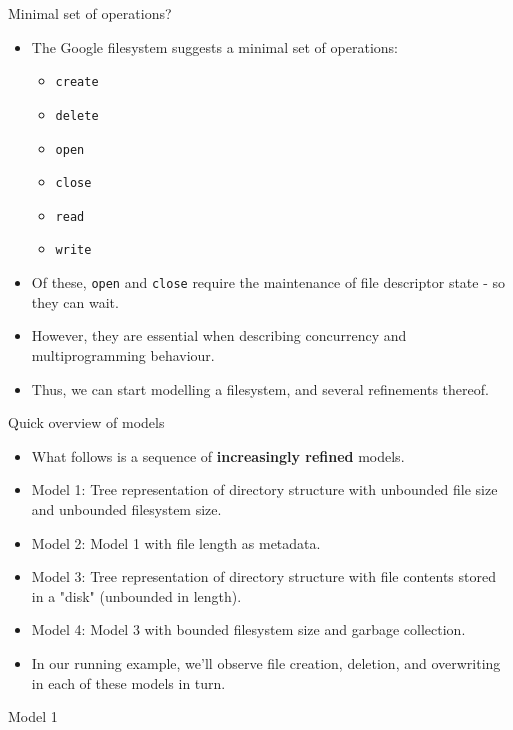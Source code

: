 \documentclass{beamer}
\begin{document}
\begin{frame}{Minimal set of operations?}
  \begin{itemize}
  \item The Google filesystem suggests a minimal set of operations:
    \begin{itemize}
    \item \texttt{create}
    \item \texttt{delete}
    \item \texttt{open}
    \item \texttt{close}
    \item \texttt{read}
    \item \texttt{write}
    \end{itemize}
  \item Of these, \texttt{open} and \texttt{close} require the
    maintenance of file descriptor state - so they can wait.
  \item However, they are essential when describing concurrency and
    multiprogramming behaviour.
  \item Thus, we can start modelling a filesystem, and several
    refinements thereof.
  \end{itemize}
\end{frame}

\begin{frame}{Quick overview of models}
  \begin{itemize}
  \item What follows is a sequence of {\bf increasingly refined} models.
  \item Model 1: Tree representation of directory structure with unbounded
    file size and unbounded filesystem size.
  \item Model 2: Model 1 with file length as metadata.
  \item Model 3: Tree representation of directory structure with
    file contents stored in a "disk" (unbounded in length).
  \item Model 4: Model 3 with bounded filesystem size and garbage
    collection.
  \item In our running example, we'll observe file creation, deletion,
    and overwriting in each of these models in turn.
  \end{itemize}
\end{frame}

\begin{frame}{Model 1}
\end{frame}
\end{document}

